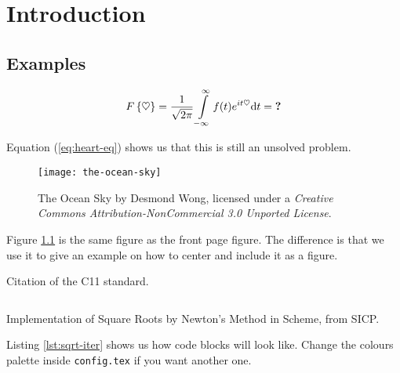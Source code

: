 
\chapter{Introduction}\label{ch:intro}

\section{Examples}

\lipsum[1-2]

\begin{equation} \label{eq:heart-eq}
  F\left\{ \heartsuit \right \} =
  \frac{1}{\sqrt{2\pi}} \int\limits_{-\infty}^{\infty} f(t) e^{i t \heartsuit} \mathrm{d} t
  = \text{\textbf{?}}
\end{equation}

Equation (\ref{eq:heart-eq}) shows us that this is still an unsolved problem.

\lipsum[3]

\begin{figure}
  \centering
  \texttt{[image: the-ocean-sky]}
  \caption[The Ocean Sky]{The Ocean Sky by Desmond Wong, licensed under a
    \emph{Creative Commons Attribution-NonCommercial 3.0 Unported License}.}
  \label{fig:ocean-sky}
\end{figure}

Figure \ref{fig:ocean-sky} is the same figure as the front page figure. The
difference is that we use it to give an example on how to center and include it
as a figure.

\lipsum[4]

Citation of the C11 standard\cite{iso2011c}.

\lipsum[11-12]

\begin{listing}
  \inputminted[frame=single,linenos,fontsize=\small,mathescape]{scm}{lst/sqrt-iter.scm}
  \caption[Square Roots in Scheme]{Implementation of Square Roots by Newton's
    Method in Scheme, from SICP.}
  \label{lst:sqrt-iter}
\end{listing}

Listing \ref{lst:sqrt-iter} shows us how code blocks will look like. Change the
colours palette inside \texttt{config.tex} if you want another one.

\lipsum[13]
